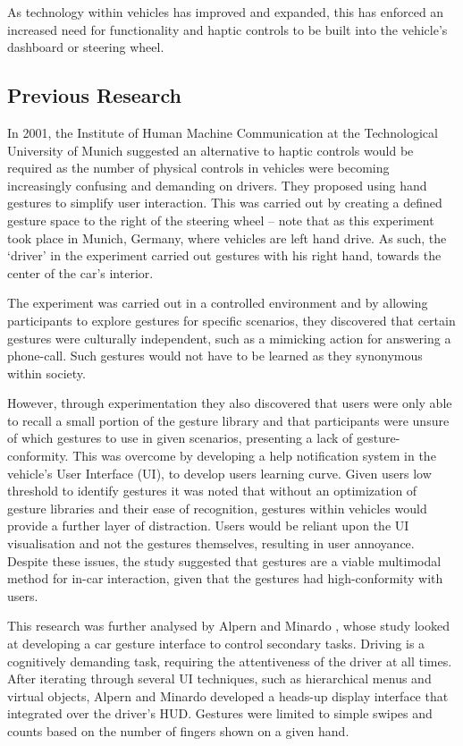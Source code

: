 \documentclass{l4proj}
\begin{document}
As technology within vehicles has improved and expanded, this has enforced an increased need for functionality and haptic controls to be built into the vehicle's dashboard or steering wheel. 

\subsection{Previous Research}
\vspace{-3mm}
In 2001, the Institute of Human Machine Communication at the Technological University of Munich \cite{}suggested an alternative to haptic controls would be required as the number of physical controls in vehicles were becoming increasingly confusing and demanding on drivers. They proposed using hand gestures to simplify user interaction. This was carried out by creating a defined gesture space to the right of the steering wheel -- note that as this experiment took place in Munich, Germany, where vehicles are left hand drive. As such, the `driver' in the experiment carried out gestures with his right hand, towards the center of the car's interior. 

The experiment was carried out in a controlled environment and by allowing participants to explore gestures for specific scenarios, they discovered that certain gestures were culturally independent, such as a mimicking action for answering a phone-call. Such gestures would not have to be learned as they synonymous within society.

However, through experimentation they also discovered that users were only able to recall a small portion of the gesture library and that participants were unsure of which gestures to use in given scenarios, presenting a lack of gesture-conformity. This was overcome by developing a help notification system in the vehicle's User Interface (UI), to develop users learning curve. Given users low threshold to identify gestures it was noted that without an optimization of gesture libraries and their ease of recognition, gestures within vehicles would provide a further layer of distraction. Users would be reliant upon the UI visualisation and not the gestures themselves, resulting in user annoyance. Despite these issues, the study suggested that gestures are a viable multimodal method for in-car interaction, given that the gestures had high-conformity with users.

This research was further analysed by Alpern and Minardo \cite{}, whose study looked at developing a car gesture interface to control secondary tasks. Driving is a cognitively demanding task, requiring the attentiveness of the driver at all times. After iterating through several UI techniques, such as hierarchical menus and virtual objects, Alpern and Minardo developed a heads-up display interface that integrated over the driver's HUD. Gestures were limited to simple swipes and counts based on the number of fingers shown on a given hand. 
\end{document}
